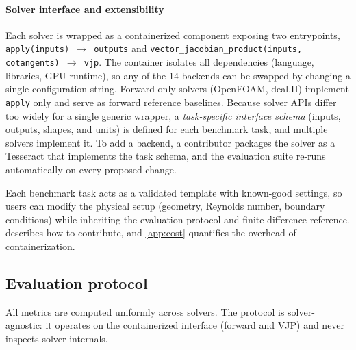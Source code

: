 \paragraph{Solver interface and extensibility}
Each solver is wrapped as a containerized component exposing two entrypoints,
\texttt{apply(inputs)\,$\rightarrow$\,outputs} and
\texttt{vector\_jacobian\_product(inputs, cotangents)\,$\rightarrow$\,vjp}.
The container isolates all dependencies (language, libraries, GPU
runtime), so any of the 14 backends can be swapped by changing a single
configuration string.
Forward-only solvers
(OpenFOAM, deal.II) implement \texttt{apply} only and serve as forward
reference baselines.
Because solver APIs differ too widely for a single generic wrapper, a
\emph{task-specific interface schema} (inputs, outputs, shapes, and units) is
defined for each benchmark task, and multiple solvers implement it. To add a
backend, a contributor packages the solver as a Tesseract that implements
the task schema, and the evaluation suite re-runs automatically on every
proposed change.

Each benchmark task acts as a validated template with known-good settings,
so users can modify the physical setup (geometry, Reynolds number, boundary conditions) while
inheriting the evaluation protocol and finite-difference reference.
 describes how to contribute, and \cref{app:cost}
quantifies the overhead of containerization.

\subsection{Evaluation protocol}
\label{sec:protocol}

All metrics are computed uniformly across solvers. The protocol is
solver-agnostic: it operates on the containerized interface (forward and
VJP) and never inspects solver internals.

